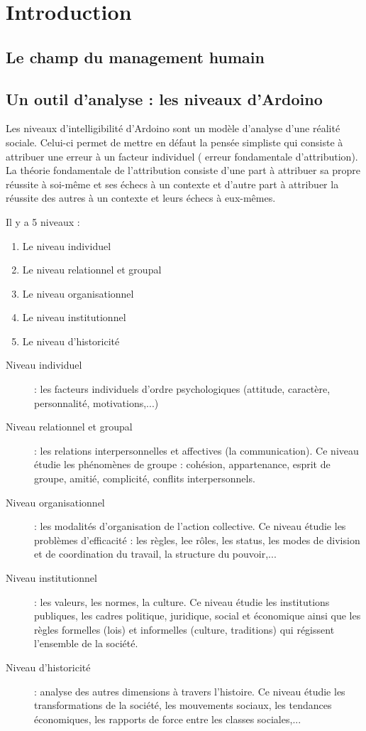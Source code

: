 \documentclass[12pt]{article}
\begin{document}
\section{Introduction}
  \subsection{Le champ du management humain}
  \subsection{Un outil d'analyse : les niveaux d'Ardoino}
  Les niveaux d'intelligibilité d'Ardoino sont un modèle d'analyse d'une réalité sociale. Celui-ci permet de mettre en défaut la pensée simpliste qui consiste à attribuer une erreur à un facteur individuel (\og{} erreur fondamentale d'attribution\fg{}). La théorie fondamentale de l'attribution consiste d'une part à attribuer sa propre réussite à soi-même et ses échecs à un contexte et d'autre part à attribuer la réussite des autres à un contexte et leurs échecs à eux-mêmes.
  
  Il y a 5 niveaux :
  
  \begin{enumerate}
   \item Le niveau individuel
   \item Le niveau relationnel et groupal
   \item Le niveau organisationnel
   \item Le niveau institutionnel
   \item Le niveau d'historicité
  \end{enumerate}
  
  
  \begin{description}
   \item[Niveau individuel] : les facteurs individuels d'ordre psychologiques (attitude, caractère, personnalité, motivations,...)
   \item[Niveau relationnel et groupal] : les relations interpersonnelles et affectives (la communication). Ce niveau étudie les phénomènes de groupe : cohésion, appartenance, esprit de groupe, amitié, complicité, conflits interpersonnels.
   \item[Niveau organisationnel] : les modalités d'organisation de l'action collective. Ce niveau étudie les problèmes d'efficacité : les règles, lee rôles, les status, les modes de division et de coordination du travail, la structure du pouvoir,... 
   \item[Niveau institutionnel] : les valeurs, les normes, la culture. Ce niveau étudie les institutions publiques, les cadres politique, juridique, social et économique ainsi que les règles formelles (lois) et informelles (culture, traditions) qui régissent l'ensemble de la société.
   \item[Niveau d'historicité] : analyse des autres dimensions à travers l'histoire. Ce niveau étudie les transformations de la société, les mouvements sociaux, les tendances économiques, les rapports de force entre les classes sociales,...
  \end{description}
\end{document}

